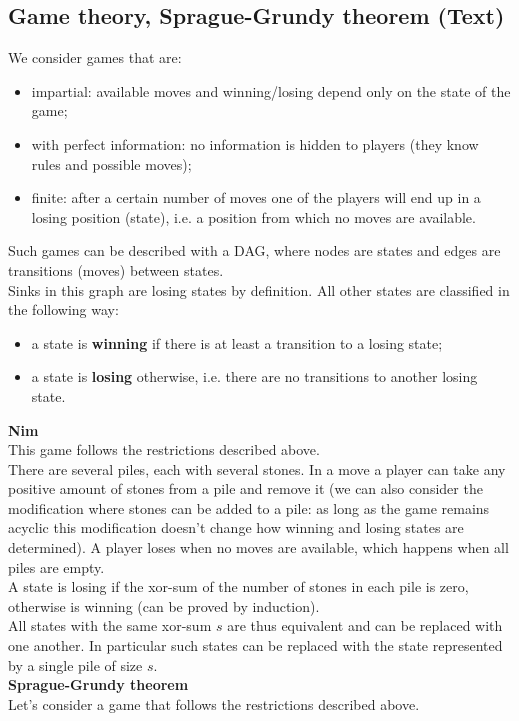 \documentclass[9pt]{extarticle}
\begin{document}
\begin{multicols*}{3}
\subsection{Game theory, Sprague-Grundy theorem (Text)}
We consider games that are:
\begin{itemize}
\item impartial: available moves and winning/losing depend only on the state of the game;
\item with perfect information: no information is hidden to players (they know rules and possible moves);
\item finite: after a certain number of moves one of the players will end up in a losing position (state),
i.e. a position from which no moves are available.
\end{itemize}
Such games can be described with a DAG, where nodes are states and edges are transitions (moves) between states. \\
Sinks in this graph are losing states by definition. All other states are classified in the following way:
\begin{itemize}
\item a state is \textbf{winning} if there is at least a transition to a losing state;
\item a state is \textbf{losing} otherwise, i.e. there are no transitions to another losing state.
\end{itemize}
\textbf{Nim} \\
This game follows the restrictions described above. \\
There are several piles, each with several stones. In a move a player can take any positive amount of stones
from a pile and remove it (we can also consider the modification where stones can be added to a pile:
as long as the game remains acyclic this modification doesn't change how winning and losing states
are determined). A player loses when no moves are available, which happens when all piles are empty. \\
A state is losing if the xor-sum of the number of stones in each pile is zero,
otherwise is winning (can be proved by induction). \\
All states with the same xor-sum $s$ are thus equivalent and can be replaced with one another.
In particular such states can be replaced with the state represented by a single pile of size $s$. \\
\textbf{Sprague-Grundy theorem} \\
Let's consider a game that follows the restrictions described above. \\

\end{multicols*}
\end{document}
